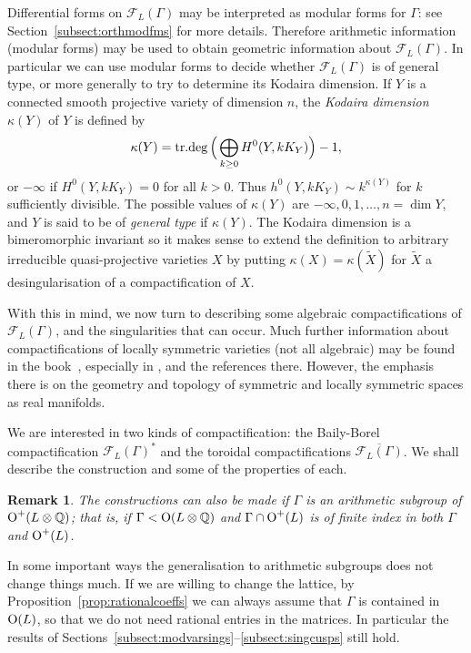 \documentclass[a4paper,11pt]{article}
\newtheorem{remark}[lemma]{Remark}
\newcommand{\QQ}{\mathbb Q}
\newcommand{\cF}{\mathcal F}
\renewcommand{\Tilde}{\widetilde}
\renewcommand{\Bar}{\overline}
\newcommand{\Orth}{\mathop{\null\mathrm {O}}\nolimits}
\newcommand{\trdeg}{\mathop{\null\mathrm {tr.deg}}\nolimits}
\begin{document}
Differential forms on $\cF_L(\Gamma)$ may be interpreted as modular
forms for $\Gamma$: see Section~\ref{subsect:orthmodfms} for more
details. Therefore arithmetic information (modular forms) may be used
to obtain geometric information about $\cF_L(\Gamma)$. In particular
we can use modular forms to decide whether $\cF_L(\Gamma)$ is of
general type, or more generally to try to determine its Kodaira
dimension. If $Y$ is a connected smooth projective variety of
dimension $n$, the \emph{Kodaira dimension} $\kappa(Y)$ of $Y$ is
defined by
\begin{equation*}
\kappa(Y)=\trdeg\Big(\bigoplus_{k\ge 0}H^0(Y,kK_Y)\Big)-1,
\end{equation*}
or $-\infty$ if $H^0(Y,kK_Y)=0$ for all $k> 0$. Thus $h^0(Y,kK_Y)\sim
k^{\kappa(Y)}$ for $k$ sufficiently divisible. The possible values of
$\kappa(Y)$ are $-\infty,0,1,\ldots,n=\dim Y$, and $Y$ is said to be of
\emph{general type} if $\kappa(Y)$. The Kodaira dimension
is a bimeromorphic invariant so it makes sense to extend the
definition to arbitrary irreducible quasi-projective varieties $X$ by
putting $\kappa(X)=\kappa(\Tilde X)$ for $\Tilde X$ a
desingularisation of a compactification of $X$.

With this in mind, we now turn to describing some algebraic
compactifications of $\cF_L(\Gamma)$, and the singularities that can
occur. Much further information about compactifications of
locally symmetric varieties (not all algebraic) may be found in the
book~\cite{BJ}, especially in \cite[Part III]{BJ}, and the references
there. However, the emphasis there is on the geometry and topology of
symmetric and locally symmetric spaces as real manifolds.

We are interested in two kinds of compactification: the
Baily-Borel compactification $\cF_L(\Gamma)^*$ and the toroidal
compactifications $\Bar{\cF_L(\Gamma)}$. We shall describe the
construction and some of the properties of each. 

\begin{remark}\label{rem:arithmeticgroup}
The constructions can also be made if $\Gamma$ is an arithmetic
subgroup of $\Orth^+(L\otimes\QQ)$; that is, if $\Gamma< \Orth(L\otimes
\QQ)$ and $\Gamma\cap \Orth^+(L)$ is of finite index in both $\Gamma$
and $\Orth^+(L)$.
\end{remark}

In some important ways the generalisation to arithmetic subgroups does
not change things much. If we are willing to change the lattice, by
Proposition~\ref{prop:rationalcoeffs} we can always assume that
$\Gamma$ is contained in $\Orth(L)$, so that we do not need rational
entries in the matrices. In particular the results of
Sections~\ref{subsect:modvarsings}--\ref{subsect:singcusps} still
hold.
\end{document}
